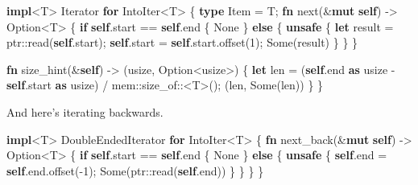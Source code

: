 \documentclass[a4paper,]{book}
\newenvironment{Shaded}{\begin{snugshade}}{\end{snugshade}}
\newcommand{\KeywordTok}[1]{\textcolor[rgb]{0.13,0.29,0.53}{\textbf{{#1}}}}
\newcommand{\DataTypeTok}[1]{\textcolor[rgb]{0.13,0.29,0.53}{{#1}}}
\newcommand{\DecValTok}[1]{\textcolor[rgb]{0.00,0.00,0.81}{{#1}}}
\newcommand{\ConstantTok}[1]{\textcolor[rgb]{0.00,0.00,0.00}{{#1}}}
\newcommand{\BuiltInTok}[1]{{#1}}
\newcommand{\NormalTok}[1]{{#1}}
\begin{document}
\begin{Shaded}
\begin{Highlighting}[]
\KeywordTok{impl}\NormalTok{<T> }\BuiltInTok{Iterator} \KeywordTok{for} \NormalTok{IntoIter<T> \{}
    \KeywordTok{type} \NormalTok{Item = T;}
    \KeywordTok{fn} \NormalTok{next(&}\KeywordTok{mut} \KeywordTok{self}\NormalTok{) -> }\DataTypeTok{Option}\NormalTok{<T> \{}
        \KeywordTok{if} \KeywordTok{self}\NormalTok{.start == }\KeywordTok{self}\NormalTok{.end \{}
            \ConstantTok{None}
        \NormalTok{\} }\KeywordTok{else} \NormalTok{\{}
            \KeywordTok{unsafe} \NormalTok{\{}
                \KeywordTok{let} \NormalTok{result = ptr::read(}\KeywordTok{self}\NormalTok{.start);}
                \KeywordTok{self}\NormalTok{.start = }\KeywordTok{self}\NormalTok{.start.offset(}\DecValTok{1}\NormalTok{);}
                \ConstantTok{Some}\NormalTok{(result)}
            \NormalTok{\}}
        \NormalTok{\}}
    \NormalTok{\}}

    \KeywordTok{fn} \NormalTok{size_hint(&}\KeywordTok{self}\NormalTok{) -> (}\DataTypeTok{usize}\NormalTok{, }\DataTypeTok{Option}\NormalTok{<}\DataTypeTok{usize}\NormalTok{>) \{}
        \KeywordTok{let} \NormalTok{len = (}\KeywordTok{self}\NormalTok{.end }\KeywordTok{as} \DataTypeTok{usize} \NormalTok{- }\KeywordTok{self}\NormalTok{.start }\KeywordTok{as} \DataTypeTok{usize}\NormalTok{)}
                  \NormalTok{/ mem::size_of::<T>();}
        \NormalTok{(len, }\ConstantTok{Some}\NormalTok{(len))}
    \NormalTok{\}}
\NormalTok{\}}
\end{Highlighting}
\end{Shaded}

And here's iterating backwards.

\begin{Shaded}
\begin{Highlighting}[]
\KeywordTok{impl}\NormalTok{<T> }\BuiltInTok{DoubleEndedIterator} \KeywordTok{for} \NormalTok{IntoIter<T> \{}
    \KeywordTok{fn} \NormalTok{next_back(&}\KeywordTok{mut} \KeywordTok{self}\NormalTok{) -> }\DataTypeTok{Option}\NormalTok{<T> \{}
        \KeywordTok{if} \KeywordTok{self}\NormalTok{.start == }\KeywordTok{self}\NormalTok{.end \{}
            \ConstantTok{None}
        \NormalTok{\} }\KeywordTok{else} \NormalTok{\{}
            \KeywordTok{unsafe} \NormalTok{\{}
                \KeywordTok{self}\NormalTok{.end = }\KeywordTok{self}\NormalTok{.end.offset(-}\DecValTok{1}\NormalTok{);}
                \ConstantTok{Some}\NormalTok{(ptr::read(}\KeywordTok{self}\NormalTok{.end))}
            \NormalTok{\}}
        \NormalTok{\}}
    \NormalTok{\}}
\NormalTok{\}}
\end{Highlighting}
\end{Shaded}
\end{document}
